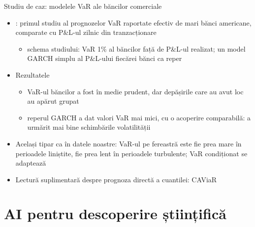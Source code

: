 \begin{frame}{Studiu de caz: modelele VaR ale băncilor comerciale}
\itemsize{\small}
\begin{itemize}
    \item {}: primul studiu al prognozelor VaR raportate efectiv de mari bănci americane, comparate cu P\&L-ul zilnic din tranzacționare
    \begin{itemize}
        \item schema studiului: VaR 1\% al băncilor față de P\&L-ul realizat; un model GARCH simplu al P\&L-ului fiecărei bănci ca reper
    \end{itemize}
    \item Rezultatele
    \begin{itemize}
        \item VaR-ul băncilor a fost în medie prudent, dar depășirile care au avut loc au apărut grupat
        \item reperul GARCH a dat valori VaR mai mici, cu o acoperire comparabilă: a urmărit mai bine schimbările volatilității
    \end{itemize}
    \item Același tipar ca în datele noastre: VaR-ul pe fereastră este fie prea mare în perioadele liniștite, fie prea lent în perioadele turbulente; VaR condiționat se adaptează
    \item Lectură suplimentară despre prognoza directă a cuantilei: CAViaR 
\end{itemize}
\end{frame}


\section{AI pentru descoperire științifică}

